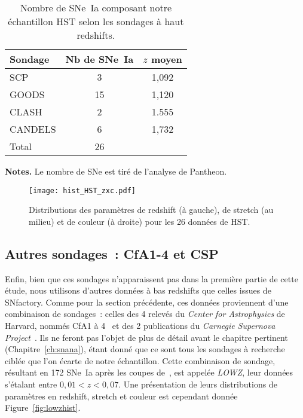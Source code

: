 \documentclass[../main/main.tex]{subfiles}
\begin{document}
\begin{table}[]
    \centering
    \begin{threeparttable}
        \caption{Nombre de SNe~Ia composant notre échantillon HST selon les
        sondages à haut redshifts.}
        \label{tab:hstcuts}
        \begin{tabular}{lcc}
            \toprule\toprule
            Sondage & Nb de SNe~Ia & $z$ moyen \\
            \midrule
            SCP     & 3            & 1,092 \\
            GOODS   & 15           & 1,120 \\
            CLASH   & 2            & 1.555\\
            CANDELS & 6            & 1,732 \\
            \midrule
            Total   & 26           & \\
            \bottomrule
        \end{tabular}
        \begin{tablenotes}[flushleft]
        \item \textbf{\hspace{-3,2pt}Notes.} Le nombre de SNe est tiré de
            l'analyse de Pantheon.
        \end{tablenotes}
    \end{threeparttable}
\end{table}

\begin{figure}[]
    \centering
    \texttt{[image: hist\_HST\_zxc.pdf]}
    \captionsetup{justification=centering}
    \caption{Distributions des paramètres de redshift (à gauche), de stretch (au
    milieu) et de couleur (à droite) pour les 26 données de HST.}
    \label{fig:hsthist}
\end{figure}

\subsection{Autres sondages~: CfA1-4 et CSP}\label{ssec:lowz}

Enfin, bien que ces sondages n'apparaissent pas dans la première partie de cette
étude, nous utilisons d'autres données à bas redshifts que celles issues de
SNfactory. Comme pour la section précédente, ces données proviennent d'une
combinaison de sondages~: celles des 4 relevés du \textit{Center for
Astrophysics} de Harvard, nommés CfA1 à 4~\citep{riess1999, jha2006,
hicken2009a, hicken2009b, hicken2012} et des 2 publications du \textit{Carnegie
Supernova Project}~\citep[CSP,][]{contreras2010, folatelli2010,
stritzinger2011}. Ils ne feront pas l'objet de plus de détail avant le chapitre
pertinent (Chapitre~\ref{ch:snana}), étant donné que ce sont tous les sondages à
recherche ciblée que l'on écarte de notre échantillon. Cette combinaison de
sondage, résultant en 172 SNe~Ia après les coupes de~\cite{scolnic2018}, est
appelée \textit{LOWZ}, leur données s'étalant entre $0,01 < z < 0,07$. Une
présentation de leurs distributions de paramètres en redshift, stretch et
couleur est cependant donnée Figure~\ref{fig:lowzhist}.
\end{document}
